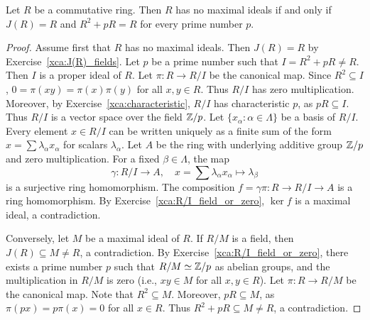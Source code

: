 

\begin{theorem}[Henriksen]
\label{thm:Henriksen}
Let $R$ be a commutative ring. Then $R$ has
no maximal ideals if and only if 
$J(R)=R$ and $R^2+pR=R$ for every prime number $p$. 
\end{theorem}

\begin{proof}
    Assume first that $R$ has no maximal ideals. Then $J(R)=R$ by 
    Exercise~\ref{xca:J(R)_fields}. Let $p$ be a prime number
    such that $I=R^2+pR\ne R$. Then $I$ is a proper ideal of $R$. 
    Let $\pi\colon R\to R/I$ be the canonical map. Since $R^2\subseteq I$, 
    $0=\pi(xy)=\pi(x)\pi(y)$ for all $x,y\in R$. Thus $R/I$ has zero multiplication. 
    Moreover, by Exercise~\ref{xca:characteristic}, 
    $R/I$ has characteristic $p$, as $pR\subseteq I$.  
    Thus $R/I$ is a vector space 
    over the field $\mathbb{Z}/p$.
    Let $\{x_\alpha:\alpha\in\Lambda\}$ be a basis
    of $R/I$. Every element $x\in R/I$ can be written uniquely
    as a finite sum of the form 
    $x=\sum \lambda_{\alpha}x_{\alpha}$ for scalars $\lambda_\alpha$. 
    Let $A$ be the ring with underlying additive group $\mathbb{Z}/p$ and zero multiplication. 
    For a fixed
    $\beta\in\Lambda$, the map 
    \[
    \gamma\colon R/I\to A,\quad 
    x=\sum \lambda_{\alpha}x_{\alpha}\mapsto \lambda_{\beta}
    \]
    is a surjective ring homomorphism. 
    The composition $f=\gamma\pi\colon R\to R/I\to A$ is a ring homomorphism. By Exercise~\ref{xca:R/I_field_or_zero}, $\ker f$ is a maximal ideal, a contradiction. 

    Conversely, let $M$ be a maximal ideal of $R$. If $R/M$ is a field, 
    then $J(R)\subseteq M\ne R$, a contradiction. 
    By Exercise~\ref{xca:R/I_field_or_zero},  there exists a prime
    number $p$ such that $R/M\simeq\mathbb{Z}/p$ as abelian groups, and the 
    multiplication in $R/M$ is zero (i.e., $xy\in M$ for all $x,y\in R$). 
    Let $\pi\colon R\to R/M$ be the canonical map. Note that 
    $R^2\subseteq M$. Moreover, $pR\subseteq M$, as 
    $\pi(px)=p\pi(x)=0$ for all $x\in R$. Thus $R^2+pR\subseteq M\ne R$, a contradiction. 
\end{proof}

